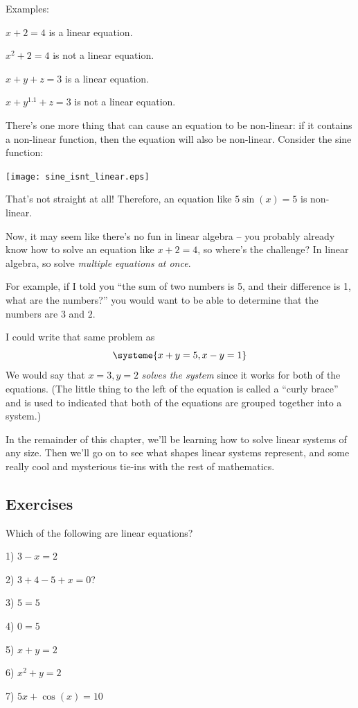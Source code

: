 \documentclass[a4paper,twoside,12pt]{memoir}  %
\begin{document}
Examples:
\begin{list}{}
\item $x + 2 = 4$ is a linear equation.
\item $x^2 + 2 = 4$ is not a linear equation.
\item $x + y + z = 3$ is a linear equation.
\item $x + y^{1.1} + z = 3$ is not a linear equation.
\end{list}

There's one more thing that can cause an equation to be non-linear: if it contains a non-linear function, then the equation will also be non-linear. Consider the sine function:

\texttt{[image: sine\_isnt\_linear.eps]}

That's not straight at all! Therefore, an equation like $5 \sin(x) = 5$ is non-linear.

Now, it may seem like there's no fun in linear algebra -- you probably already know how to solve an equation like $x + 2 = 4$, so where's the challenge?
In linear algebra, so solve \textit{multiple equations at once}.

For example, if I told you ``the sum of two numbers is 5, and their difference is 1, what are the numbers?'' you would want to be able to determine that the numbers are $3$ and $2$.

I could write that same problem as
\begin{equation*}
  \systeme{
    x + y = 5,
    x - y = 1
    }
\end{equation*}
We would say that $x = 3, y = 2$ \textit{solves the system} since it works for both of the equations.
(The little thing to the left of the equation is called a ``curly brace'' and is used to indicated that both of the equations are grouped together into a system.)

In the remainder of this chapter, we'll be learning how to solve linear systems of any size.
Then we'll go on to see what shapes linear systems represent, and some really cool and mysterious tie-ins with the rest of mathematics.

\subsection{Exercises}
Which of the following are linear equations?
\begin{list}{}
\item 1) $3 - x = 2$
\item 2) $3 + 4 -5 + x = 0$?
\item 3) $5 = 5$
\item 4) $0 = 5$
\item 5) $x + y = 2$
\item 6) $x^2 + y = 2$
\item 7) $5x + \cos(x) = 10$
\end{list}
\end{document}

